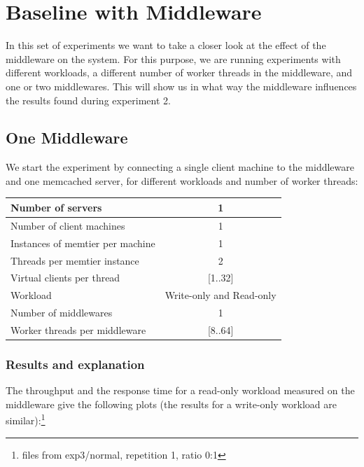 \documentclass[11pt,a4paper]{article}
\begin{document}
\section{Baseline with Middleware}

In this set of experiments we want to take a closer look at the effect of the middleware on the system. For this purpose, we are running experiments with different workloads, a different number of worker threads in the middleware, and one or two middlewares. This will show us in what way the middleware influences the results found during experiment 2. 


\subsection{One Middleware}

We start the experiment by connecting a single client machine to the middleware and one memcached server, for different workloads and number of worker threads: 

\begin{center}
	\scriptsize{
		\begin{tabular}{|l|c|}
			\hline Number of servers                & 1                        \\ 
			\hline Number of client machines        & 1                        \\ 
			\hline Instances of memtier per machine & 1                        \\ 
			\hline Threads per memtier instance     & 2                        \\
			\hline Virtual clients per thread       & [1..32]                  \\ 
			\hline Workload                         & Write-only and Read-only \\
			\hline Number of middlewares            & 1                        \\
			\hline Worker threads per middleware    & [8..64]                  \\
			\hline 
		\end{tabular}
	} 
\end{center}

\subsubsection{Results and explanation}

The throughput and the response time for a read-only workload measured on the middleware give the following plots (the results for a write-only workload are similar):\footnote{files from exp3/normal, repetition 1, ratio 0:1}
\end{document}
